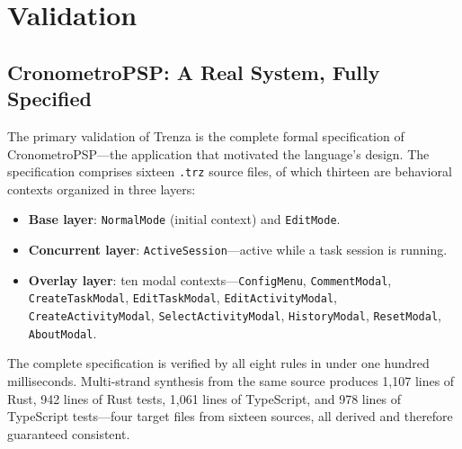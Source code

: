 \section{Validation}
\label{sec:validation}

\subsection{CronometroPSP: A Real System, Fully Specified}
\label{sec:cronometro-spec}

The primary validation of Trenza is the complete formal specification of
CronometroPSP---the application that motivated the language's design. The
specification comprises sixteen \texttt{.trz} source files, of which thirteen
are behavioral contexts organized in three layers:

\begin{sloppypar}
\begin{itemize}
  \item \textbf{Base layer}: \texttt{NormalMode} (initial context) and
        \texttt{EditMode}.
  \item \textbf{Concurrent layer}: \texttt{ActiveSession}---active while a task
        session is running.
  \item \textbf{Overlay layer}: ten modal contexts---\texttt{ConfigMenu},
        \texttt{Comment\-Modal}, \texttt{Create\-Task\-Modal},
        \texttt{Edit\-Task\-Modal}, \texttt{Edit\-Activity\-Modal},
        \texttt{Create\-Activity\-Modal}, \texttt{Select\-Activity\-Modal},
        \texttt{History\-Modal}, \texttt{ResetModal}, \texttt{About\-Modal}.
\end{itemize}
\end{sloppypar}

The complete specification is verified by all eight rules in under one hundred
milliseconds. Multi-strand synthesis from the same source produces 1,107 lines
of Rust, 942 lines of Rust tests, 1,061 lines of TypeScript, and 978 lines of
TypeScript tests---four target files from sixteen sources, all derived and
therefore guaranteed consistent.

